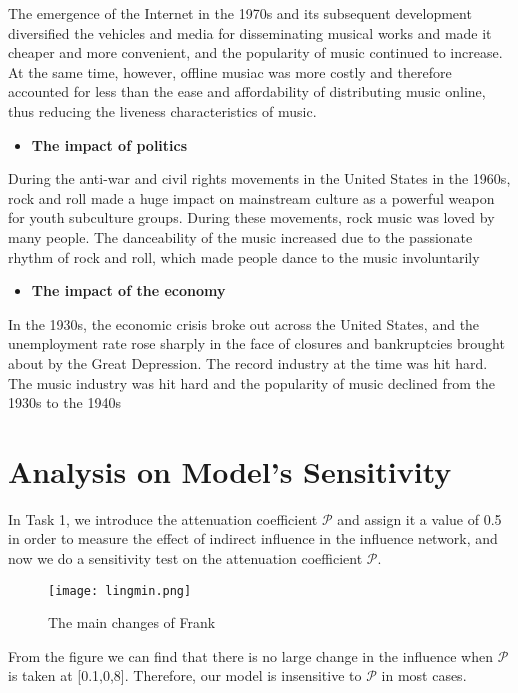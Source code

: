 \documentclass[12pt]{article}  %
\newcommand{\upcite}[1]{\textsuperscript{\textsuperscript{\cite{#1}}}}
\begin{document}
	The emergence of the Internet in the 1970s and its subsequent development diversified the vehicles and media for disseminating musical works and made it cheaper and more convenient, and the popularity of music continued to increase. At the same time, however, offline musiac was more costly and therefore accounted for less than the ease and affordability of distributing music online, thus reducing the liveness characteristics of music.

\begin{itemize}
	\item \textbf{The impact of politics}
\end{itemize}

	During the anti-war and civil rights movements in the United States in the 1960s, rock and roll made a huge impact on mainstream culture as a powerful weapon for youth subculture groups. During these movements, rock music was loved by many people. The danceability of the music increased due to the passionate rhythm of rock and roll, which made people dance to the music involuntarily\upcite{4}

\begin{itemize}
	\item \textbf{The impact of the economy}
\end{itemize}

	In the 1930s, the economic crisis broke out across the United States, and the unemployment rate rose sharply in the face of closures and bankruptcies brought about by the Great Depression. The record industry at the time was hit hard. The music industry was hit hard and the popularity of music declined from the 1930s to the 1940s\upcite{5}
	
\section{Analysis on Model's Sensitivity}
In Task 1, we introduce the attenuation coefficient $\mathcal{P}$ and assign it a value of 0.5 in order to measure the effect of indirect influence in the influence network, and now we do a sensitivity test on the attenuation coefficient $\mathcal{P}$.
\begin{figure}[H]
	\centering
	\texttt{[image: lingmin.png]}
	\caption{The main changes of Frank}
	\label{img}
\end{figure}
From the figure we can find that there is no large change in the influence when $\mathcal{P}$ is taken at [0.1,0,8]. Therefore, our model is insensitive to $\mathcal{P}$ in most cases.
\end{document}
